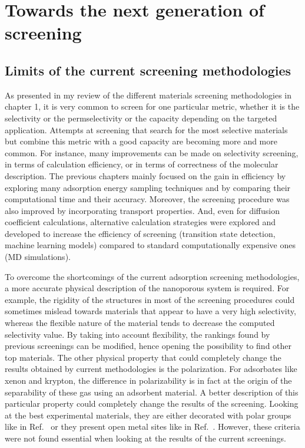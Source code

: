 \documentclass[main]{subfiles}
\begin{document}
\chapter{Towards the next generation of screening}
\vspace*{-1\baselineskip}

\section{Limits of the current screening methodologies}

As presented in my review of the different materials screening methodologies in chapter 1, it is very common to screen for one particular metric, whether it is the selectivity or the permselectivity or the capacity depending on the targeted application. Attempts at screening that search for the most selective materials but combine this metric with a good capacity are becoming more and more common.\autocite{Chung_2019,Zhang_2022,Solanki_2020} For instance, many improvements can be made on selectivity screening, in terms of calculation efficiency, or in terms of correctness of the molecular description. The previous chapters mainly focused on the gain in efficiency by exploring many adsorption energy sampling techniques and by comparing their computational time and their accuracy. Moreover, the screening procedure was also improved by incorporating transport properties. And, even for diffusion coefficient calculations, alternative calculation strategies were explored and developed to increase the efficiency of screening (transition state detection, machine learning models) compared to standard computationally expensive ones (MD simulations).

To overcome the shortcomings of the current adsorption screening methodologies, a more accurate physical description of the nanoporous system is required. For example, the rigidity of the structures in most of the screening procedures could sometimes mislead towards materials that appear to have a very high selectivity, whereas the flexible nature of the material tends to decrease the computed selectivity value. By taking into account flexibility, the rankings found by previous screenings can be modified, hence opening the possibility to find other top materials. The other physical property that could completely change the results obtained by current methodologies is the polarization. For adsorbates like xenon and krypton, the difference in polarizability is in fact at the origin of the separability of these gas using an adsorbent material. A better description of this particular property could completely change the results of the screening. Looking at the best experimental materials, they are either decorated with polar groups like in Ref.~\cite{Li_2019} or they present open metal sites like in Ref.~\cite{Pei_2022}. However, these criteria were not found essential when looking at the results of the current screenings. 
\end{document}
